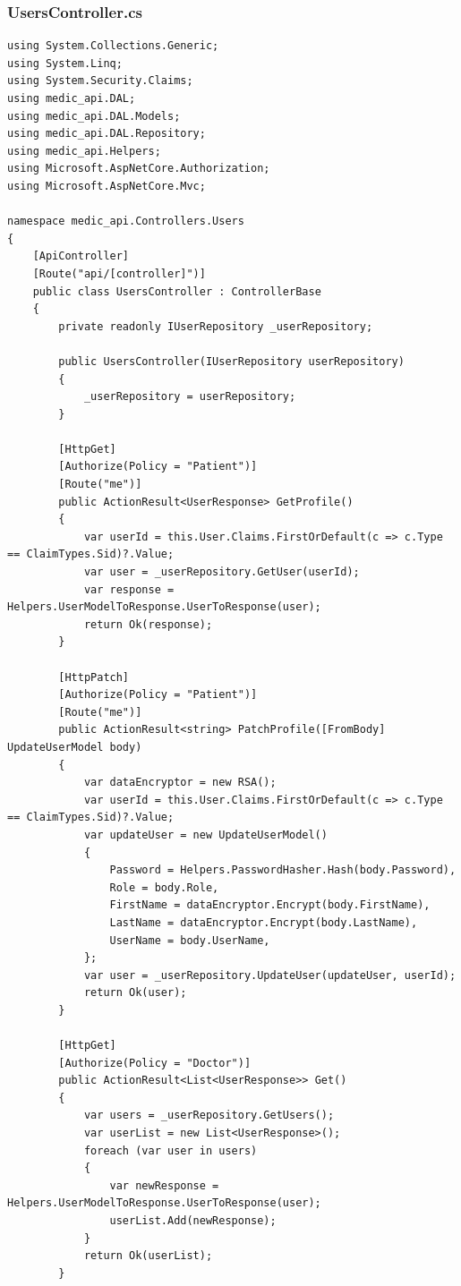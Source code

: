 \documentclass[12pt,a4paper]{article}
\begin{document}
	\subsubsection{UsersController.cs}
	\begin{lstlisting}
using System.Collections.Generic;
using System.Linq;
using System.Security.Claims;
using medic_api.DAL;
using medic_api.DAL.Models;
using medic_api.DAL.Repository;
using medic_api.Helpers;
using Microsoft.AspNetCore.Authorization;
using Microsoft.AspNetCore.Mvc;

namespace medic_api.Controllers.Users
{
    [ApiController]
    [Route("api/[controller]")]
    public class UsersController : ControllerBase
    {
        private readonly IUserRepository _userRepository;

        public UsersController(IUserRepository userRepository)
        {
            _userRepository = userRepository;
        }
        
        [HttpGet]
        [Authorize(Policy = "Patient")]
        [Route("me")]
        public ActionResult<UserResponse> GetProfile()
        {
            var userId = this.User.Claims.FirstOrDefault(c => c.Type == ClaimTypes.Sid)?.Value;
            var user = _userRepository.GetUser(userId);
            var response = Helpers.UserModelToResponse.UserToResponse(user);
            return Ok(response);
        }
        
        [HttpPatch]
        [Authorize(Policy = "Patient")]
        [Route("me")]
        public ActionResult<string> PatchProfile([FromBody] UpdateUserModel body)
        {
            var dataEncryptor = new RSA();
            var userId = this.User.Claims.FirstOrDefault(c => c.Type == ClaimTypes.Sid)?.Value;
            var updateUser = new UpdateUserModel()
            {
                Password = Helpers.PasswordHasher.Hash(body.Password),
                Role = body.Role,
                FirstName = dataEncryptor.Encrypt(body.FirstName),
                LastName = dataEncryptor.Encrypt(body.LastName),
                UserName = body.UserName,
            };
            var user = _userRepository.UpdateUser(updateUser, userId);
            return Ok(user);
        }
        
        [HttpGet]
        [Authorize(Policy = "Doctor")]
        public ActionResult<List<UserResponse>> Get()
        {
            var users = _userRepository.GetUsers();
            var userList = new List<UserResponse>();
            foreach (var user in users)
            {
                var newResponse = Helpers.UserModelToResponse.UserToResponse(user);
                userList.Add(newResponse);
            }
            return Ok(userList);
        }


\end{lstlisting}
\end{document}
